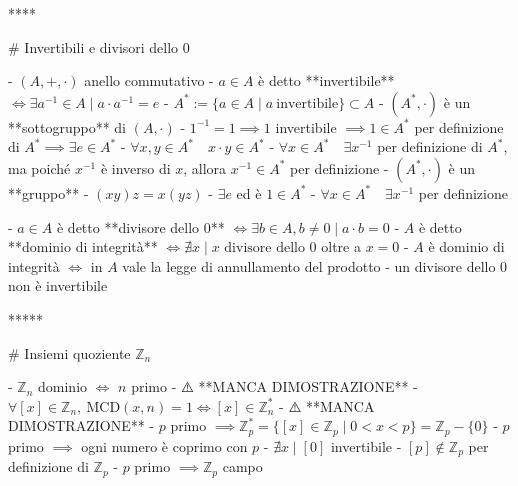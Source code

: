 ****

# Invertibili e divisori dello $0$

- $(A, +, \cdot)$ anello commutativo
  - $a \in A$ è detto **invertibile** \( \iff \exists a^{-1} \in A \mid a \cdot a^{-1}=e \)
    - $A^* := \{a \in A \mid a \ \textrm{invertibile}\} \subset A$
    - $(A^*, \cdot)$ è un **sottogruppo** di $(A, \cdot)$
      - $1^{-1} = 1 \implies 1$ invertibile $\implies 1 \in A^*$ per definizione di $A^* \implies \exists e \in A^*$
      - \( \forall x, y \in A^{*} \quad x \cdot y \in A^{*} \)
      - \( \forall x \in A^{*} \quad \exists x^{-1} \) per definizione di $A^*$, ma poiché $x^{-1}$ è inverso di $x$, allora $x^{-1} \in A^*$ per definizione
    - $(A^*, \cdot)$ è un **gruppo**
      - $(xy)z = x(yz)$
      - $\exists e$ ed è $1 \in A^*$
      - \( \forall x \in A^{*} \quad \exists x^{-1}\) per definizione

  - $a \in A$ è detto **divisore dello $0$** \( \iff \exists b \in A, b \neq 0 \mid a \cdot b=0 \)
    - $A$ è detto **dominio di integrità** $\iff \nexists x \mid x \textrm{  divisore dello 0}$ oltre a $x = 0$
    - $A$ è dominio di integrità $\iff$ in $A$ vale la legge di annullamento del prodotto
      - un divisore dello $0$ non è invertibile

*****

# Insiemi quoziente $\mathbb{Z}_n$

- $\mathbb{Z}_n$ dominio $\iff$ $n$ primo
      - ⚠️ **MANCA DIMOSTRAZIONE**
- $\forall [x] \in \mathbb{Z}_n, \ \textrm{MCD}(x, n) = 1 \iff [x] \in \mathbb{Z}^*_n$
      - ⚠️ **MANCA DIMOSTRAZIONE**
    - $p$ primo $\implies \mathbb{Z}_p^* = \{[x] \in \mathbb{Z}_p \mid  0 \lt x \lt p\} = \mathbb{Z}_p - \{0\}$
        - $p$ primo $\implies$ ogni numero è coprimo con $p$
        - $\nexists x \mid [0]$ invertibile
        - $[p] \notin \mathbb{Z}_p$ per definizione di $\mathbb{Z}_p$
        - $p$ primo $\implies \mathbb{Z}_p$ campo
